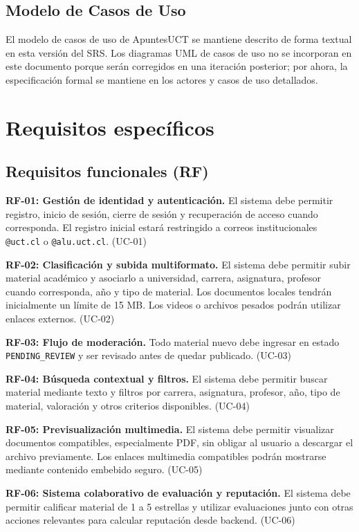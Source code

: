 \documentclass[12pt,a4paper]{article}
\begin{document}
\subsection{Modelo de Casos de Uso}

El modelo de casos de uso de ApuntesUCT se mantiene descrito de forma textual en esta versión del SRS. Los diagramas UML de casos de uso no se incorporan en este documento porque serán corregidos en una iteración posterior; por ahora, la especificación formal se mantiene en los actores y casos de uso detallados.

\section{Requisitos específicos}

\subsection{Requisitos funcionales (RF)}

\noindent\textbf{RF-01: Gestión de identidad y autenticación.} El sistema debe permitir registro, inicio de sesión, cierre de sesión y recuperación de acceso cuando corresponda. El registro inicial estará restringido a correos institucionales \texttt{@uct.cl} o \texttt{@alu.uct.cl}. (UC-01)

\noindent\textbf{RF-02: Clasificación y subida multiformato.} El sistema debe permitir subir material académico y asociarlo a universidad, carrera, asignatura, profesor cuando corresponda, año y tipo de material. Los documentos locales tendrán inicialmente un límite de 15 MB. Los videos o archivos pesados podrán utilizar enlaces externos. (UC-02)

\noindent\textbf{RF-03: Flujo de moderación.} Todo material nuevo debe ingresar en estado \texttt{PENDING\_REVIEW} y ser revisado antes de quedar publicado. (UC-03)

\noindent\textbf{RF-04: Búsqueda contextual y filtros.} El sistema debe permitir buscar material mediante texto y filtros por carrera, asignatura, profesor, año, tipo de material, valoración y otros criterios disponibles. (UC-04)

\noindent\textbf{RF-05: Previsualización multimedia.} El sistema debe permitir visualizar documentos compatibles, especialmente PDF, sin obligar al usuario a descargar el archivo previamente. Los enlaces multimedia compatibles podrán mostrarse mediante contenido embebido seguro. (UC-05)

\noindent\textbf{RF-06: Sistema colaborativo de evaluación y reputación.} El sistema debe permitir calificar material de 1 a 5 estrellas y utilizar evaluaciones junto con otras acciones relevantes para calcular reputación desde backend. (UC-06)
\end{document}
